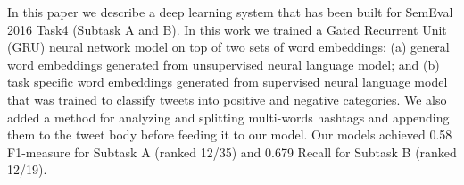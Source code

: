 In this paper we describe a deep learning system that has been built for SemEval 2016 Task4 (Subtask A and B). In this work we trained a Gated Recurrent Unit (GRU) neural network model on top of two sets of word embeddings: (a) general word embeddings generated from unsupervised neural language model; and (b) task specific word embeddings generated from supervised neural language model that was trained to classify tweets into positive and negative categories. We also added a method for analyzing and splitting multi-words hashtags and appending them to the tweet body before feeding it to our model. Our models achieved 0.58 F1-measure for Subtask A (ranked 12/35) and 0.679 Recall for Subtask B (ranked 12/19).
